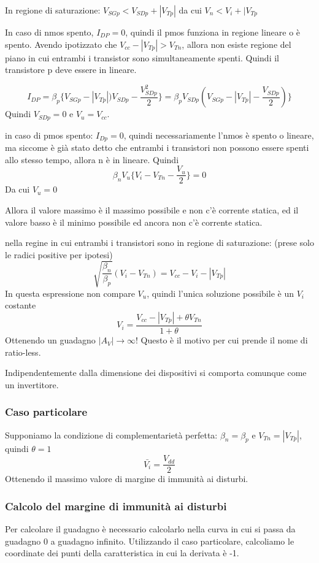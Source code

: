 \documentclass[../template]{subfiles}
\begin{document}
In regione di saturazione: $V_{SGp} < V_{SDp} + |V_{Tp}|$ da cui $V_n < V_i + |V_{Tp}$
\begin{tcolorbox}
    In caso di nmos spento, $I_{DP} = 0$, quindi il pmos funziona in regione lineare o è spento. Avendo ipotizzato che $V_{cc} - |V_{Tp}| > V_{Tn}$, allora non esiste regione del piano in cui entrambi i transistor sono simultaneamente spenti. Quindi il transistore p deve essere in lineare.

    \[
    I_{DP} = \beta_p \big\{ V_{SGp} - |V_{Tp}|) V_{SDp} - \frac{V_{SDp}^2}{2} \big\} = \beta_p V_{SDp} (V_{SGp} - |V_{Tp}| - \frac{V_{SDp}}{2}) \big\}
\]
Quindi $V_{SDp} =0$ e $V_u = V_{cc}$.
\end{tcolorbox}
\begin{tcolorbox}
    in caso di pmos spento: $I_{Dp} = 0$, quindi necessariamente l'nmos è spento o lineare, ma siccome è già stato detto che entrambi i transistori non possono essere spenti allo stesso tempo, allora n è in lineare.
    Quindi
\[
    \beta_n V_u \big\{ V_i - V_{Tn} - \frac{V_u}{2}\big\} = 0
\]
Da cui $V_u = 0$
\end{tcolorbox}
Allora il valore massimo è il massimo possibile e non c'è corrente statica, ed il valore basso è il minimo possibile ed ancora non c'è corrente statica.
\begin{tcolorbox}
    nella regine in cui entrambi i transistori sono in regione di saturazione: (prese solo le radici positive per ipotesi)
    \[
        \sqrt{\frac{\beta_n}{\beta_p}} (V_i - V_{Tn}) = V_{cc} - V_i - |V_{Tp}|
    \]
    In questa espressione non compare $V_u$, quindi l'unica soluzione possibile è un $V_i$ costante
    \[
        V_i = \frac{V_{cc} - |V_{Tp}| + \theta V_{Tn}}{1 + \theta}
    \]
    Ottenendo un guadagno $|A_V| \to \infty$! Questo è il motivo per cui prende il nome di ratio-less.
\end{tcolorbox}
Indipendentemente dalla dimensione dei dispositivi si comporta comunque come un invertitore.

\subsubsection{Caso particolare}
Supponiamo la condizione di complementarietà perfetta: $\beta_n = \beta_p$ e $V_{Tn} = |V_{Tp}|$, quindi $\theta = 1$
\[
    \bar{V_i} = \frac{V_{dd}}{2}
\]
Ottenendo il massimo valore di margine di immunità ai disturbi.


\subsubsection{Calcolo del margine di immunità ai disturbi}
Per calcolare il guadagno è necessario calcolarlo nella curva in cui si passa da guadagno 0 a guadagno infinito.
Utilizzando il caso particolare, calcoliamo le coordinate dei punti della caratteristica in cui la derivata è -1.
\end{document}
